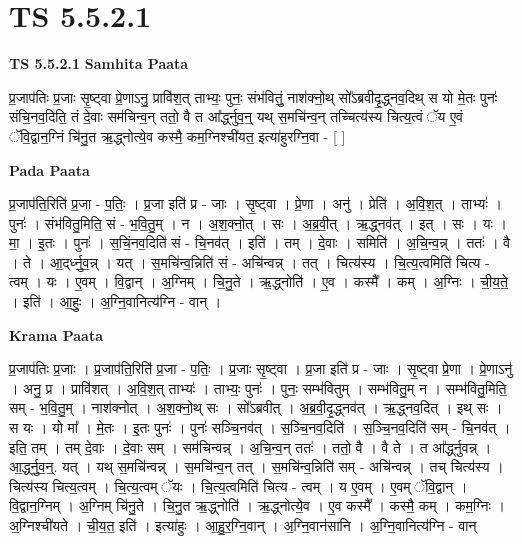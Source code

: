 \documentclass[17pt]{extarticle}
\begin{document}
\section{ TS 5.5.2.1 }

\textbf{TS 5.5.2.1 } \newline
\textbf{Samhita Paata} \newline

प्र॒जाप॑तिः प्र॒जाः सृ॒ष्ट्वा प्रे॒णाऽनु॒ प्रावि॑श॒त् ताभ्यः॒ पुनः॒ संभ॑वितुं॒ नाश॑क्नो॒थ् सो᳚ऽब्रवीदृ॒द्ध्नव॒दिथ् स यो मे॒तः पुनः॑ संचि॒नव॒दिति॒ तं दे॒वाः सम॑चिन्व॒न् ततो॒ वै त आ᳚र्द्ध्नुव॒न्॒ यथ् स॒मचि॑न्व॒न् तच्चित्य॑स्य चित्य॒त्वं ॅय ए॒वं ॅवि॒द्वान॒ग्निं चि॑नु॒त ऋ॒द्ध्नोत्ये॒व कस्मै॒ कम॒ग्निश्ची॑यत॒ इत्या॑हुरग्नि॒वा - [  ] \newline

\textbf{Pada Paata} \newline

प्र॒जाप॑ति॒रिति॑ प्र॒जा - प॒तिः॒ । प्र॒जा इति॑ प्र - जाः । सृ॒ष्ट्वा । प्रे॒णा । अनु॑ । प्रेति॑ । अ॒वि॒श॒त् । ताभ्यः॑ । पुनः॑ । संभ॑वितु॒मिति॒ सं - भ॒वि॒तु॒म् । न । अ॒श॒क्नो॒त् । सः । अ॒ब्र॒वी॒त् । ऋ॒द्ध्नव॑त् । इत् । सः । यः । मा॒ । इ॒तः । पुनः॑ । स॒चिं॒नव॒दिति॑ सं - चि॒नव॑त् । इति॑ । तम् । दे॒वाः । समिति॑ । अ॒चि॒न्व॒न्न् । ततः॑ । वै । ते । आ॒द्‌र्ध्नु॒व॒न्न् । यत् । स॒मचि॑न्व॒न्निति॑ सं - अचि॑न्वन्न् । तत् । चित्य॑स्य । चि॒त्य॒त्वमिति॑ चित्य - त्वम् । यः । ए॒वम् । वि॒द्वान् । अ॒ग्निम् । चि॒नु॒ते । ऋ॒द्ध्नोति॑ । ए॒व । कस्मै᳚ । कम् । अ॒ग्निः । ची॒य॒ते॒ । इति॑ । आ॒हुः॒ । अ॒ग्नि॒वानित्य॑ग्नि - वान् ।  \newline


\textbf{Krama Paata} \newline

प्र॒जाप॑तिः प्र॒जाः । प्र॒जाप॑ति॒रिति॑ प्र॒जा - प॒तिः॒ । प्र॒जाः सृ॒ष्ट्वा । प्र॒जा इति॑ प्र - जाः । सृ॒ष्ट्वा प्रे॒णा । प्रे॒णाऽनु॑ । अनु॒ प्र । प्रावि॑शत् । अ॒वि॒श॒त् ताभ्यः॑ । ताभ्यः॒ पुनः॑ । पुनः॒ सम्भ॑वितुम् । सम्भ॑वितु॒म् न । सम्भ॑वितु॒मिति॒ सम् - भ॒वि॒तु॒म् । नाश॑क्नोत् । अ॒श॒क्नो॒थ् सः । सो᳚ऽब्रवीत् । अ॒ब्र॒वी॒दृ॒द्ध्नव॑त् । ऋ॒द्ध्नव॒दित् । इथ् सः । स यः । यो मा᳚ । मे॒तः । इ॒तः पुनः॑ । पुनः॑ सञ्चि॒नव॑त् । स॒ञ्चि॒नव॒दिति॑ । स॒ञ्चि॒नव॒दिति॑ सम् - चि॒नव॑त् । इति॒ तम् । तम् दे॒वाः । दे॒वाः सम् । सम॑चिन्वन्न् । अ॒चि॒न्व॒न् ततः॑ । ततो॒ वै । वै ते । त आ᳚र्द्ध्नुवन्न् । आ॒र्द्ध्नु॒व॒न्॒. यत् । यथ् स॒मचि॑न्वन्न् । स॒मचि॑न्व॒न् तत् । स॒मचि॑न्व॒न्निति॑ सम् - अचि॑न्वन्न् । तच् चित्य॑स्य । चित्य॑स्य चित्य॒त्वम् । चि॒त्य॒त्वम् ॅयः । चि॒त्य॒त्वमिति॑ चित्य - त्वम् । य ए॒वम् । ए॒वम् ॅवि॒द्वान् । वि॒द्वान॒ग्निम् । अ॒ग्निम् चि॑नु॒ते । चि॒नु॒त ऋ॒द्ध्नोति॑ । ऋ॒द्ध्नोत्ये॒व । ए॒व कस्मै᳚ । कस्मै॒ कम् । कम॒ग्निः । अ॒ग्निश्ची॑यते । ची॒य॒त॒ इति॑ । इत्या॑हुः । आ॒हु॒र॒ग्नि॒वान् । अ॒ग्नि॒वान॑सानि । अ॒ग्नि॒वानित्य॑ग्नि - वान् \newline
\end{document}
